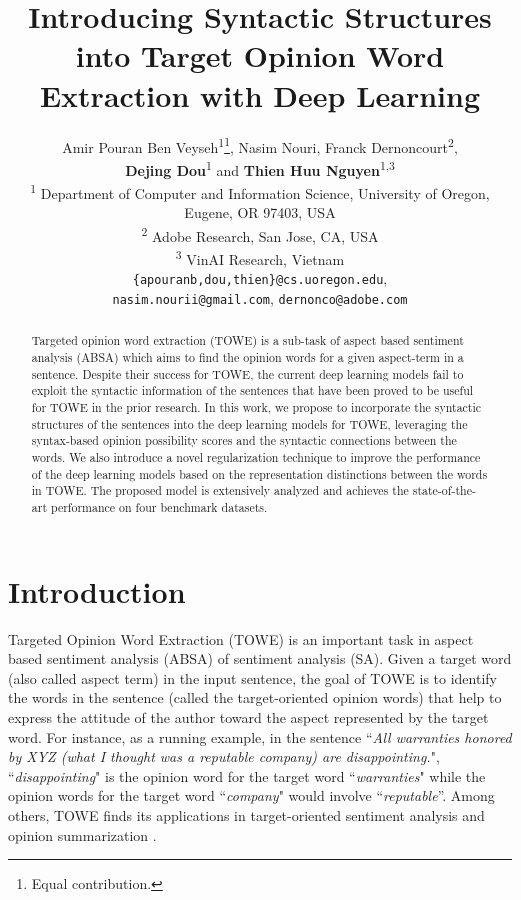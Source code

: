 \documentclass[11pt,a4paper]{article}
\title{Introducing Syntactic Structures into Target Opinion Word Extraction with Deep Learning}
\author{Amir Pouran Ben Veyseh\textsuperscript{\rm 1}\thanks{\text{ } Equal contribution.}, \text{ } Nasim Nouri\printfnsymbol{1}, Franck Dernoncourt\textsuperscript{\rm 2},\\
{\bf Dejing Dou}\textsuperscript{\rm 1} and {\bf Thien Huu Nguyen}\textsuperscript{\rm 1,3} \\
\textsuperscript{\rm 1} Department of Computer and Information Science, University of Oregon,
\\Eugene, OR 97403, USA\\
\textsuperscript{\rm 2} Adobe Research, San Jose, CA, USA\\
\textsuperscript{\rm 3} VinAI Research, Vietnam\\
  \texttt{\{apouranb,dou,thien\}@cs.uoregon.edu}, \\ {\tt nasim.nourii@gmail.com}, {\tt dernonco@adobe.com}
}
\date{}
\begin{document}
\maketitle
\begin{abstract}
Targeted opinion word extraction (TOWE) is a sub-task of aspect based sentiment analysis (ABSA) which aims to find the opinion words for a given aspect-term in a sentence. Despite their success for TOWE, the current deep learning models fail to exploit the syntactic information of the sentences that have been proved to be useful for TOWE in the prior research. In this work, we propose to incorporate the syntactic structures of the sentences into the deep learning models for TOWE, leveraging the syntax-based opinion possibility scores and the syntactic connections between the words. We also introduce a novel regularization technique to improve the performance of the deep learning models based on the representation distinctions between the words in TOWE. The proposed model is extensively analyzed and achieves the state-of-the-art performance on four benchmark datasets.



\end{abstract}


\section{Introduction}








Targeted Opinion Word Extraction (TOWE) is an important task in aspect based sentiment analysis (ABSA) of sentiment analysis (SA). Given a target word (also called aspect term) in the input sentence, the goal of TOWE is to identify the words in the sentence (called the target-oriented opinion words) that help to express the attitude of the author toward the aspect represented by the target word. For instance, as a running example, in the sentence ``\textit{All warranties honored by XYZ (what I thought was a reputable company) are disappointing.}", ``\textit{disappointing}" is the opinion word for the target word ``\textit{warranties}" while the opinion words for the target word ``\textit{company}" would involve ``\textit{reputable}''. Among others, TOWE finds its applications in target-oriented sentiment analysis \citep{tang2015effective,xue2018aspect,Veyseh:20e} and opinion summarization \citep{wu2020latent}.
\end{document}
